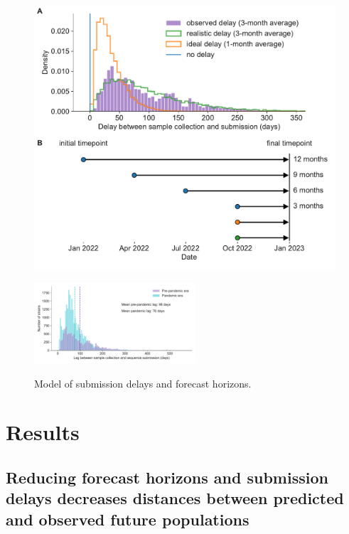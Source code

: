 \documentclass[9pt,lineno]{elife}
\begin{document}
\begin{figure}[htb]
\includegraphics[width=\linewidth]{figures/distribution_of_delays_and_horizons}
\caption{Model of submission delays and forecast horizons.}
\label{fig:model_of_delays_and_horizons}
%
{\includegraphics[width=6cm]{figures/distribution_of_delays_by_pandemic_era}}\label{figsupp:distribution_of_delays_by_pandemic_era}
\end{figure}

\section{Results}

\subsection{Reducing forecast horizons and submission delays decreases distances between predicted and observed future populations}
\end{document}
